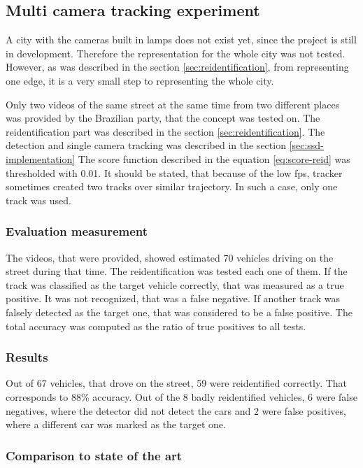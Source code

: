 \documentclass[a4paper,11pt,titlepage,twoside]{article}
\numberwithin{figure}{section}
\begin{document}
\subsection{Multi camera tracking experiment}
\label{sec:multi-camera-tracking}

A city with the cameras built in lamps does not exist yet, since the project is still in development. Therefore the representation for the whole city was not tested. However, as was described in the section \ref{sec:reidentification}, from representing one edge, it is a very small step to representing the whole city. 

Only two videos of the same street at the same time from two different places was provided by the Brazilian party, that the concept was tested on. The reidentification part was described in the section \ref{sec:reidentification}. The detection and single camera tracking was described in the section \ref{sec:ssd-implementation} The score function described in the equation \ref{eq:score-reid} was thresholded with 0.01.  It should be stated, that because of the low fps, tracker sometimes created two tracks over similar trajectory. In such a case, only one track was used.

\subsubsection{Evaluation measurement}
The videos, that were provided, showed estimated 70 vehicles driving on the street during that time. The reidentification was tested each one of them. If the track was classified as the target vehicle correctly, that was measured as a true positive. It was not recognized, that was a false negative. If another track was falsely detected as the target one, that was considered to be a false positive. The total accuracy was computed as the ratio of true positives to all tests. 

\subsubsection{Results}
Out of 67 vehicles, that drove on the street, 59 were reidentified correctly. That corresponds to 88\% accuracy. Out of the 8 badly reidentified vehicles, 6 were false negatives, where the detector did not detect the cars and 2 were false positives, where a different car was marked as the target one.

\subsubsection{Comparison to state of the art}
\end{document}
